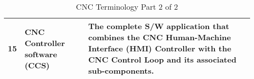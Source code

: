 \begin{table}[ht]
\begin{center}
\begin{tabular}{ |p{0.5cm}|p{3.4cm}|p{12.0cm}| }
			\hline 15 & CNC Controller software (CCS) & The complete S/W application that combines the CNC Human-Machine Interface (HMI) Controller with the CNC Control Loop and its associated sub-components. \\
			
			\hline
		\end{tabular}
		\caption{CNC Terminology Part 2 of 2}		
		\label{table:CNC-Terminology Part 2 of 2}
	\end{center}
\end{table}  
